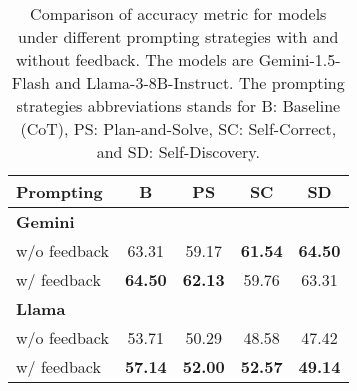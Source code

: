 \begin{table}[ht]
\small
\centering
\begin{tabular}{lcccc}
\toprule
Prompting               & B & PS & SC & SD \\
\midrule
\textbf{Gemini} & \multicolumn{4}{c}{} \\
w/o feedback     & 63.31    & 59.17          & \textbf{61.54}        & \textbf{64.50}          \\
w/ feedback      & \textbf{64.50}    & \textbf{62.13}          & 59.76        & 63.31          \\
\midrule
\textbf{Llama} & \multicolumn{4}{c}{} \\
w/o feedback     & 53.71    & 50.29          & 48.58        & 47.42          \\
w/ feedback      & \textbf{57.14}    & \textbf{52.00}          & \textbf{52.57  }      & \textbf{49.14}          \\
\bottomrule
\end{tabular}
\caption{Comparison of accuracy metric for models under different prompting strategies with and without feedback. The models are Gemini-1.5-Flash and Llama-3-8B-Instruct. The prompting strategies abbreviations stands for B: Baseline (CoT), PS: Plan-and-Solve, SC: Self-Correct, and SD: Self-Discovery.}
\label{table:prompt_accuracy}
\end{table}